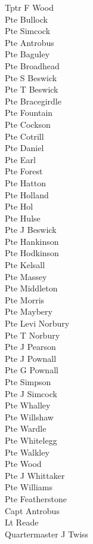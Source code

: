 \begin{multicols}{2}
  Tptr F Wood \\
  Pte Bullock \\
  Pte Simcock \\
  Pte Antrobus \\
  Pte Baguley \\
  Pte Broadhead \\
  Pte S Beswick \\
  Pte T Beswick \\
  Pte Bracegirdle \\
  Pte Fountain \\
  Pte Cockson \\
  Pte Cotrill \\
  Pte Daniel \\
  Pte Earl \\
  Pte Forest \\
  Pte Hatton \\
  Pte Holland \\
  Pte Hol \\
  Pte Hulse \\
  Pte J Beswick \\
  Pte Hankinson \\
  Pte Hodkinson \\
  Pte Kelsall \\
  Pte Massey \\
  Pte Middleton \\
  Pte Morris \\
  Pte Maybery \\
  Pte Levi Norbury \\
  Pte T Norbury \\
  Pte J Pearson \\
  Pte J Pownall \\
  Pte G Pownall \\
  Pte Simpson \\
  Pte J Simcock \\
  Pte Whalley \\
  Pte Willshaw \\
  Pte Wardle \\
  Pte Whitelegg \\
  Pte Walkley \\
  Pte Wood \\
  Pte J Whittaker \\
  Pte Williams \\
  Pte Featherstone \\
  Capt Antrobus \\
  Lt Reade \\
  Quartermaster J Twiss \\

\end{multicols}
